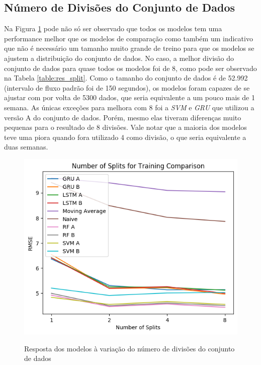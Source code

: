 \subsection{Número de Divisões do Conjunto de Dados}

Na Figura \ref{figure:res_split} pode não só ser observado que todos os modelos tem uma performance melhor que os modelos de comparação como também um indicativo que não é necessário um tamanho muito grande de treino para que os modelos se ajustem a distribuição do conjunto de dados. No caso, a melhor divisão do conjunto de dados para quase todos os modelos foi de 8, como pode ser observado na Tabela \ref{table:res_split}. Como o tamanho do conjunto de dados é de 52.992 (intervalo de fluxo padrão foi de 150 segundos), os modelos foram capazes de se ajustar com por volta de 5300 dados, que seria equivalente a um pouco mais de 1 semana. As únicas exceções para melhora com 8 foi a \textit{\acrshort{SVM}} e \textit{\acrshort{GRU}} que utilizou a versão A do conjunto de dados. Porém, mesmo elas tiveram diferenças muito pequenas para o resultado de 8 divisões. Vale notar que a maioria dos modelos teve uma piora quando fora utilizado 4 como divisão, o que seria equivalente a duas semanas.

\begin{figure}[htbp]
    \centering
    \includegraphics[scale=0.8]{monography/img/number_of_splits_for_training_comparison_rmse.png}
    \label{figure:res_split}
    \caption[Resposta dos modelos à variação do número de divisões do conjunto de dados]{Resposta dos modelos à variação do número de divisões do conjunto de dados}
\end{figure} 

